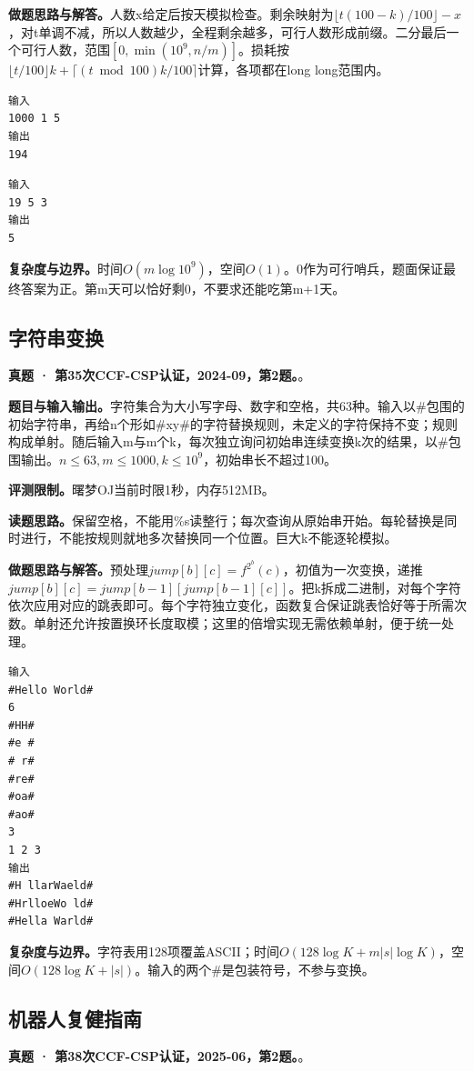 \noindent\textbf{做题思路与解答。}人数x给定后按天模拟检查。剩余映射为$\lfloor t(100-k)/100\rfloor-x$，对t单调不减，所以人数越少，全程剩余越多，可行人数形成前缀。二分最后一个可行人数，范围$[0,\min(10^9,n/m)]$。损耗按$\lfloor t/100\rfloor k+\lceil (t\bmod100)k/100\rceil$计算，各项都在long long范围内。
\begin{verbatim}
输入
1000 1 5
输出
194
\end{verbatim}
\begin{verbatim}
输入
19 5 3
输出
5
\end{verbatim}

\noindent\textbf{复杂度与边界。}时间$O(m\log 10^9)$，空间$O(1)$。0作为可行哨兵，题面保证最终答案为正。第m天可以恰好剩0，不要求还能吃第m+1天。
\subsection{字符串变换}
\textbf{真题 · 第35次CCF-CSP认证，2024-09，第2题。}。

\noindent\textbf{题目与输入输出。}字符集合为大小写字母、数字和空格，共63种。输入以\#包围的初始字符串，再给n个形如\#xy\#的字符替换规则，未定义的字符保持不变；规则构成单射。随后输入m与m个k，每次独立询问初始串连续变换k次的结果，以\#包围输出。$n\le63,m\le1000,k\le10^9$，初始串长不超过100。

\noindent\textbf{评测限制。}曙梦OJ当前时限1秒，内存512MB。

\noindent\textbf{读题思路。}保留空格，不能用\%s读整行；每次查询从原始串开始。每轮替换是同时进行，不能按规则就地多次替换同一个位置。巨大k不能逐轮模拟。

\noindent\textbf{做题思路与解答。}预处理$jump[b][c]=f^{2^b}(c)$，初值为一次变换，递推$jump[b][c]=jump[b-1][jump[b-1][c]]$。把k拆成二进制，对每个字符依次应用对应的跳表即可。每个字符独立变化，函数复合保证跳表恰好等于所需次数。单射还允许按置换环长度取模；这里的倍增实现无需依赖单射，便于统一处理。
\begin{verbatim}
输入
#Hello World#
6
#HH#
#e #
# r#
#re#
#oa#
#ao#
3
1 2 3
输出
#H llarWaeld#
#HrlloeWo ld#
#Hella Warld#
\end{verbatim}

\noindent\textbf{复杂度与边界。}字符表用128项覆盖ASCII；时间$O(128\log K+m|s|\log K)$，空间$O(128\log K+|s|)$。输入的两个\#是包装符号，不参与变换。

\subsection{机器人复健指南}
\textbf{真题 · 第38次CCF-CSP认证，2025-06，第2题。}。

